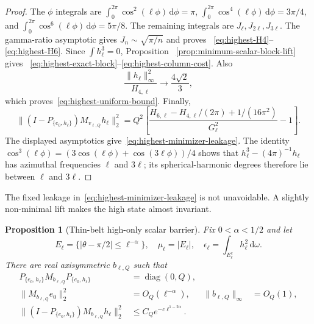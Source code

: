\documentclass[11pt]{article}
\newcommand{\dd}{\,\mathrm d}
\DeclareMathOperator{\diag}{diag}
\newtheorem{proposition}[theorem]{Proposition}
\theoremstyle{definition}
\theoremstyle{remark}
\begin{document}
\begin{proof}
The $\phi$ integrals are
$\int_0^{2\pi}\cos^2(\ell\phi)\dd\phi=\pi$,
$\int_0^{2\pi}\cos^4(\ell\phi)\dd\phi=3\pi/4$, and
$\int_0^{2\pi}\cos^6(\ell\phi)\dd\phi=5\pi/8$.
The remaining integrals are $J_\ell,J_{2\ell},J_{3\ell}$.
The gamma-ratio asymptotic gives
$J_n\sim\sqrt{\pi/n}$ and proves
~\eqref{eq:highest-H4}--\eqref{eq:highest-H6}.
Since $\int h_\ell^3=0$, Proposition
~\ref{prop:minimum-scalar-block-lift} gives
~\eqref{eq:highest-exact-block}--\eqref{eq:highest-column-cost}.
Also
\begin{equation}
 \frac{\|h_\ell\|_\infty^2}{H_{4,\ell}}\longrightarrow
 \frac{4\sqrt2}{3},
\end{equation}
which proves~\eqref{eq:highest-uniform-bound}.  Finally,
\begin{equation}
 \|(I-P_{\{e_0,h_\ell\}})M_{v_{\ell,Q}}h_\ell\|_2^2
 =Q^2\left[
 \frac{H_{6,\ell}-H_{4,\ell}/(2\pi)+1/(16\pi^2)}
 {G_\ell^2}-1\right].
\end{equation}
The displayed asymptotics give~\eqref{eq:highest-minimizer-leakage}.
The identity
$\cos^3(\ell\phi)=(3\cos(\ell\phi)+\cos(3\ell\phi))/4$
shows that $h_\ell^3-(4\pi)^{-1}h_\ell$ has azimuthal frequencies
$\ell$ and $3\ell$; its spherical-harmonic degrees therefore lie between
$\ell$ and $3\ell$.
\end{proof}

The fixed leakage in~\eqref{eq:highest-minimizer-leakage} is not unavoidable.
A slightly non-minimal lift makes the high state almost invariant.

\begin{proposition}[Thin-belt high-only scalar barrier]
\label{prop:thin-belt-barrier}
Fix $0<\alpha<1/2$ and let
\begin{equation}
 E_\ell=\{|\theta-\pi/2|\leq\ell^{-\alpha}\},
 \quad
 \mu_\ell=|E_\ell|,
 \quad
 \epsilon_\ell=\int_{E_\ell^c}h_\ell^2\dd\omega.
\end{equation}
There are real axisymmetric $b_{\ell,Q}$ such that
\begin{align}
 P_{\{e_0,h_\ell\}}M_{b_{\ell,Q}}P_{\{e_0,h_\ell\}}
 &=\diag(0,Q),\label{eq:belt-exact-block}\\
 \|M_{b_{\ell,Q}}e_0\|_2^2
 &=O_Q(\ell^{-\alpha}),&
 \|b_{\ell,Q}\|_\infty&=O_Q(1),\label{eq:belt-cost-bound}\\
 \|(I-P_{\{e_0,h_\ell\}})M_{b_{\ell,Q}}h_\ell\|_2^2
 &\leq C_Qe^{-c\ell^{1-2\alpha}}.
 \label{eq:belt-leakage-bound}
\end{align}
\end{proposition}
\end{document}
